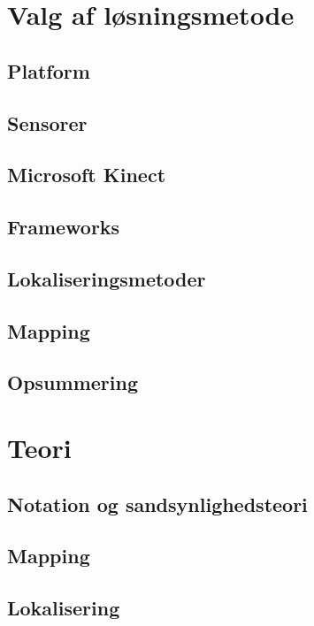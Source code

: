 \clearpage

\part{Valg af løsningsmetode}


\chapter{Platform}

\chapter{Sensorer}

\chapter{Microsoft Kinect}

\chapter{Frameworks}



\chapter{Lokaliseringsmetoder}

\chapter{Mapping}

\chapter{Opsummering}


\part{Teori}
\chapter{Notation og sandsynlighedsteori}

\chapter{Mapping}


\chapter{Lokalisering}



